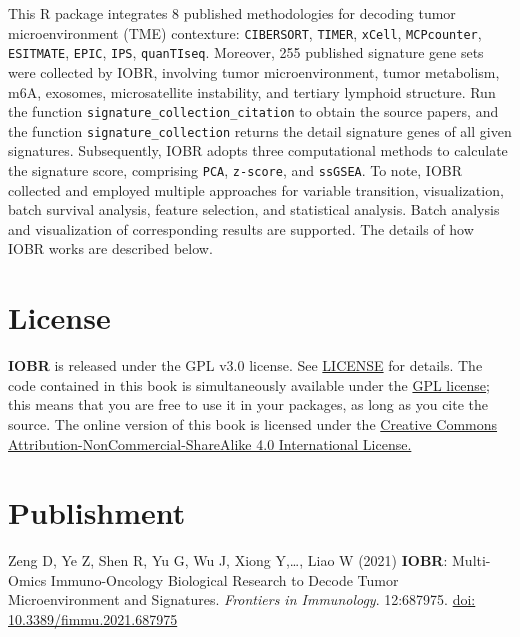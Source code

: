 \documentclass[
  12pt,
]{book}
\theoremstyle{definition}
\theoremstyle{definition}
\theoremstyle{definition}
\theoremstyle{definition}
\theoremstyle{remark}
\begin{document}
This R package integrates 8 published methodologies for decoding tumor microenvironment (TME) contexture: \texttt{CIBERSORT}, \texttt{TIMER}, \texttt{xCell}, \texttt{MCPcounter}, \texttt{ESITMATE}, \texttt{EPIC}, \texttt{IPS}, \texttt{quanTIseq}. Moreover, 255 published signature gene sets were collected by IOBR, involving tumor microenvironment, tumor metabolism, m6A, exosomes, microsatellite instability, and tertiary lymphoid structure. Run the function \texttt{signature\_collection\_citation} to obtain the source papers, and the function \texttt{signature\_collection} returns the detail signature genes of all given signatures. Subsequently, IOBR adopts three computational methods to calculate the signature score, comprising \texttt{PCA}, \texttt{z-score}, and \texttt{ssGSEA}. To note, IOBR collected and employed multiple approaches for variable transition, visualization, batch survival analysis, feature selection, and statistical analysis. Batch analysis and visualization of corresponding results are supported. The details of how IOBR works are described below.

\hypertarget{license}{%
\section{License}\label{license}}

\textbf{IOBR} is released under the GPL v3.0 license. See \href{https://github.com/IOBR/IOBR/blob/master/LICENSE}{LICENSE} for details. The code contained in this book is simultaneously available under the \href{https://www.gnu.org/licenses/why-not-lgpl.html}{GPL license}; this means that you are free to use it in your packages, as long as you cite the source. The online version of this book is licensed under the \href{https://creativecommons.org/licenses/by-nc-sa/4.0/}{Creative Commons Attribution-NonCommercial-ShareAlike 4.0 International License.}

\hypertarget{publishment}{%
\section{Publishment}\label{publishment}}

Zeng D, Ye Z, Shen R, Yu G, Wu J, Xiong Y,\ldots, Liao W (2021) \textbf{IOBR}: Multi-Omics Immuno-Oncology Biological Research to Decode Tumor Microenvironment and Signatures. \emph{Frontiers in Immunology}. 12:687975. \href{https://www.frontiersin.org/articles/10.3389/fimmu.2021.687975/full}{doi: 10.3389/fimmu.2021.687975}
\end{document}
